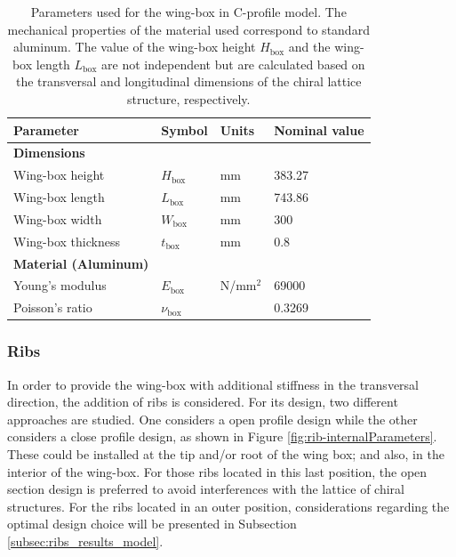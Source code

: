     \begin{table}[!htpb]
    \centering
    \begin{tabular}{|l|lll|}
    \hline
    \textbf{Parameter} & \multicolumn{1}{l|}{\textbf{Symbol}} & \multicolumn{1}{l|}{\textbf{Units}} & \textbf{Nominal value} \\ \hline \hline
    {\textbf{Dimensions}} &  &  &  \\ \hline
    Wing-box height & \multicolumn{1}{l|}{$H_{\mathrm{box}}$} & \multicolumn{1}{l|}{mm} & 383.27 \\ \hline
    Wing-box length & \multicolumn{1}{l|}{$L_{\mathrm{box}}$} & \multicolumn{1}{l|}{mm} & 743.86 \\ \hline
    Wing-box width & \multicolumn{1}{l|}{$W_{\mathrm{box}}$} & \multicolumn{1}{l|}{mm} & 300 \\ \hline
    Wing-box thickness & \multicolumn{1}{l|}{$t_{\mathrm{box}}$} & \multicolumn{1}{l|}{mm} & 0.8 \\ \hline \hline
    {\textbf{Material (Aluminum)}} &  &  &  \\ \hline
    Young's modulus & \multicolumn{1}{l|}{$E_{\mathrm{box}}$} & \multicolumn{1}{l|}{N/mm$^2$} & 69000 \\ \hline
    Poisson's ratio & \multicolumn{1}{l|}{$\nu_{\mathrm{box}}$} & \multicolumn{1}{l|}{} & 0.3269 \\ \hline
    \end{tabular}
    \caption[Parameters used for the wing-box in C-profile model]{Parameters used for the wing-box in C-profile model. The mechanical properties of the material used correspond to standard aluminum. The value of the wing-box height $H_{\mathrm{box}}$ and the wing-box length $L_{\mathrm{box}}$ are not independent but are calculated based on the transversal and longitudinal dimensions of the chiral lattice structure, respectively.}
    \label{tab:parameters_wing-box}
    \end{table}

    \clearpage
    \subsubsection{Ribs} \label{subsubsec:Ribs_Parametrization}

    In order to provide the wing-box with additional stiffness in the transversal direction, the addition of ribs is considered. For its design, two different approaches are studied. One considers a open profile design while the other considers a close profile design, as shown in Figure \ref{fig:rib-internalParameters}. These could be installed at the tip and/or root of the wing box; and also, in the interior of the wing-box. For those ribs located in this last position, the open section design is preferred to avoid interferences with the lattice of chiral structures. For the ribs located in an outer position, considerations regarding the optimal design choice will be presented in Subsection \ref{subsec:ribs_results_model}.

